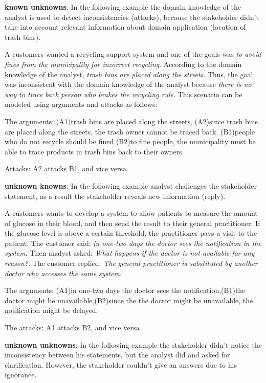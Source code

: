 \documentclass[]{llncs}
\begin{document}
\textbf{known unknowns}: In the following example the domain knowledge
of the analyst is used to detect inconsistencies (attacks), because the
stakeholder didn't take into account relevant information about domain
application (location of trash bins).

A customers wanted a recycling-support system and one of the goals was
\emph{to avoid fines from the municipality for incorrect recycling}.
According to the domain knowledge of the analyst, \emph{trash bins are
placed along the streets}. Thus, the goal was inconsistent with the
domain knowledge of the analyst because \emph{there is no way to trace
back person who brakes the recycling rule}. This scenario can be modeled
using arguments and attacks as follows:

The arguments: (A1)trash bins are placed along the streets, (A2)since
trash bins are placed along the streets, the trash owner cannot be
traced back. (B1)people who do not recycle should be fined (B2)to fine
people, the municipality must be able to trace products in trash bins
back to their owners.

Attacks: A2 attacks B1, and vice versa.

\textbf{unknown knowns}: In the following example analyst challenges the
stakeholder statement, as a result the stakeholder reveals new
information (reply).

A customers wants to develop a system to allow patients to measure the
amount of glucose in their blood, and then send the result to their
general practitioner. If the glucose level is above a certain threshold,
the practitioner pays a visit to the patient. The customer said:
\emph{in one-two days the doctor sees the notification in the system}.
Then analyst asked: \emph{What happens if the doctor is not available
for any reason?}. The customer replied: \emph{The general practitioner
is substituted by another doctor who accesses the same system}.

The arguments: (A1)in one-two days the doctor sees the
notification,(B1)the doctor might be unavailable,(B2)since the the
doctor might be unavailable, the notification might be delayed.

The attacks: A1 attacks B2, and vice versa

\textbf{unknown unknowns}: In the following example the stakeholder
didn't notice the inconsistency between his statements, but the analyst
did and asked for clarification. However, the stakeholder couldn't give
an answers due to his ignorance.
\end{document}
